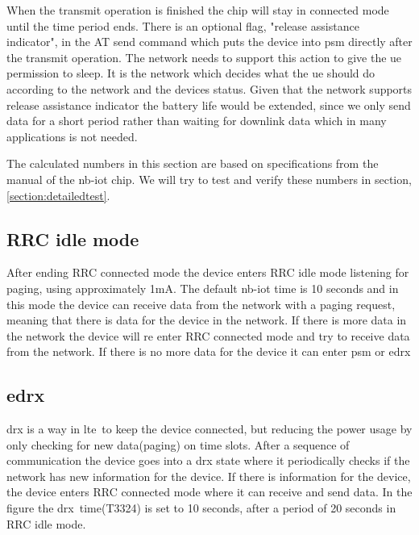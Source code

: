 \documentclass[USenglish]{ifimaster}  %
\begin{document}
When the transmit operation is finished the chip will stay in connected mode until the time period ends. There is an optional flag, "release assistance indicator", in the AT send command which puts the device into \acrshort{psm} directly after the transmit operation. The network needs to support this action to give the \acrshort{ue} permission to sleep. It is the network which decides what the \acrshort{ue} should do according to the network and the devices status. Given that the network supports release assistance indicator the battery life would be extended, since we only send data for a short period rather than waiting for downlink data which in many applications is not needed.

The calculated numbers in this section are based on specifications from the manual of the \acrshort{nb-iot} chip\cite{datasheet:ubloxchip}. We will try to test and verify these numbers in section, \vref{section:detailedtest}.

\subsection{RRC idle mode}
After ending RRC connected mode the device enters RRC idle mode listening for paging, using approximately 1mA. The default \acrshort{nb-iot} time is 10 seconds and in this mode the device can receive data from the network with a paging request, meaning that there is data for the device in the network. If there is more data in the network the device will re enter RRC connected mode and try to receive data from the network. If there is no more data for the device it can enter \acrshort{psm} or \acrshort{edrx}

\subsection{\acrfull{edrx}} \label{ssection:edrx}
\acrfull{drx} is a way in \acrshort{lte} to keep the device connected, but reducing the power usage by only checking for new data(paging) on time slots. After a sequence of communication the device goes into a \acrshort{drx} state where it periodically checks if the network has new information for the device. If there is information for the device, the device enters RRC connected mode where it can receive and send data. In the figure the \acrshort{drx} time(\acrfull{T3324}) is set to 10 seconds, after a period of 20 seconds in RRC idle mode.
\end{document}
